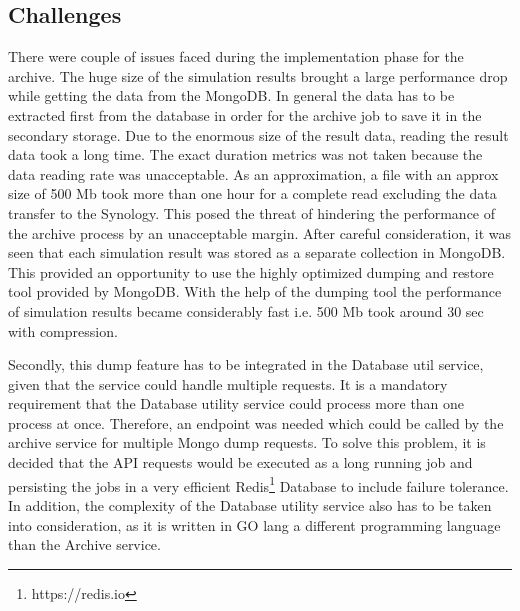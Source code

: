 \subsection{Challenges}
There were couple of issues faced during the implementation phase for the archive. The huge size of the simulation results brought a large
performance drop while getting the data from the MongoDB. In general the data has to be extracted first from the database in order for the archive job
to save it in the secondary storage. Due to the enormous size of the result data, reading the result data took a long time. The exact duration
metrics was not taken because the data reading rate was unacceptable. As an approximation, a file with an approx size of 500 Mb took more than one hour 
for a complete read excluding the data transfer to the Synology. This posed the threat of hindering the performance of the archive process by an unacceptable margin.
After careful consideration, it was seen that each simulation result was stored as a separate collection in MongoDB. This provided an opportunity to use
the highly optimized dumping and restore tool provided by MongoDB. With the help of the dumping tool the performance of simulation results became considerably fast i.e.
500 Mb took around 30 sec with compression.

Secondly, this dump feature has to be integrated in the Database util service, given that the service could handle multiple requests. It is a mandatory requirement that the Database
utility service could process more than one process at once. Therefore, an endpoint was needed which could be called by the archive service for multiple Mongo dump
requests. To solve this problem, it is decided that the API requests would be executed as a long running job and persisting the jobs in a very efficient 
Redis\footnote{https://redis.io} Database to include failure tolerance. In addition, the complexity of the Database utility service also has to be taken into consideration, as it 
is written in GO lang a different programming language than the Archive service.

